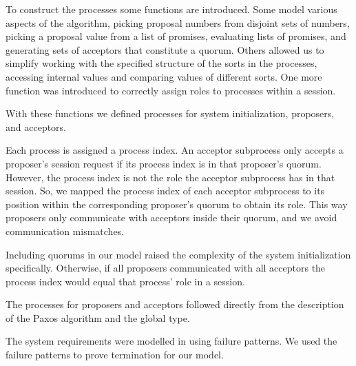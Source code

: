 To construct the processes some functions are introduced.
Some model various aspects of the algorithm, \eg picking proposal numbers from disjoint sets of numbers, picking a proposal value from a list of promises, evaluating lists of promises, and generating sets of acceptors that constitute a quorum.
Others allowed us to simplify working with the specified structure of the sorts in the processes, \ie accessing internal values and comparing values of different sorts.
One more function was introduced to correctly assign roles to processes within a session.

With these functions we defined processes for system initialization, proposers, and acceptors.

Each process is assigned a process index.
An acceptor subprocess only accepts a proposer's session request if its process index is in that proposer's quorum.
However, the process index is not the role the acceptor subprocess has in that session.
So, we mapped the process index of each acceptor subprocess to its position within the corresponding proposer's quorum to obtain its role.
This way proposers only communicate with acceptors inside their quorum, and we avoid communication mismatches.

Including quorums in our model raised the complexity of the system initialization specifically.
Otherwise, if all proposers communicated with all acceptors the process index would equal that process' role in a session.

The processes for proposers and acceptors followed directly from the description of the Paxos algorithm and the global type.

The system requirements were modelled in \FTMPST using failure patterns.
We used the failure patterns to prove termination for our model.

